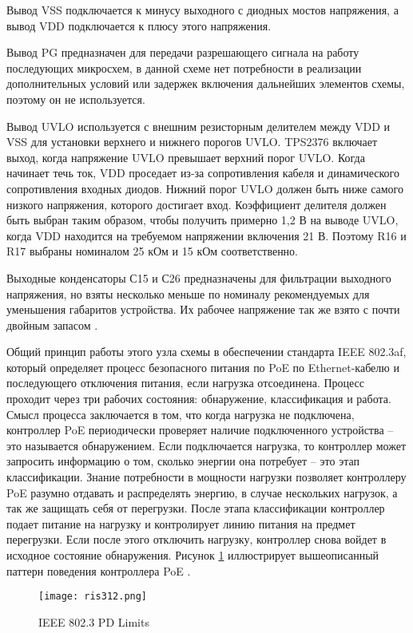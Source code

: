 Вывод VSS подключается к минусу выходного с диодных мостов напряжения, 
а вывод VDD подключается к плюсу этого напряжения.

Вывод PG предназначен для передачи разрешающего сигнала на работу последующих микросхем,
в данной схеме нет потребности в реализации дополнительных условий или задержек включения
дальнейших элементов схемы, поэтому он не используется.

Вывод UVLO используется с внешним резисторным делителем между VDD и VSS для установки 
верхнего и нижнего порогов UVLO. TPS2376 включает выход, когда напряжение UVLO превышает верхний 
порог UVLO. Когда начинает течь ток, VDD проседает из-за сопротивления кабеля и динамического 
сопротивления входных диодов. Нижний порог UVLO должен быть ниже самого низкого напряжения, 
которого достигает вход. Коэффициент делителя должен быть выбран таким образом, 
чтобы получить примерно 1,2 В на выводе UVLO, когда VDD находится на требуемом 
напряжении включения 21 В. Поэтому R16 и R17 выбраны номиналом 25 кОм и 15 кОм соответственно.

Выходные конденсаторы С15 и С26 предназначены для фильтрации выходного напряжения, но взяты 
несколько меньше по номиналу рекомендуемых для уменьшения габаритов устройства. Их рабочее
напряжение так же взято с почти двойным запасом \cite{TPS2376:datasheet}.

Общий принцип работы этого узла схемы в обеспечении стандарта IEEE 802.3af, который определяет 
процесс безопасного питания по PoE по Ethernet-кабелю и последующего отключения питания, 
если нагрузка отсоединена. Процесс проходит через три рабочих состояния: обнаружение, 
классификация и работа. Смысл процесса заключается в том, что когда нагрузка не подключена,
контроллер PoE периодически проверяет наличие подключенного устройства -- это называется 
обнаружением. Если подключается нагрузка, то контроллер может запросить информацию о том,
сколько энергии она потребует -- это этап классификации. Знание потребности в мощности нагрузки 
позволяет контроллеру PoE разумно отдавать и распределять энергию, в случае нескольких нагрузок,
а так же защищать себя от перегрузки. После этапа классификации контроллер подает питание на 
нагрузку и контролирует линию питания на предмет перегрузки. Если после этого отключить нагрузку,
контроллер снова войдет в исходное состояние обнаружения. Рисунок \ref{ris:312}  иллюстрирует 
вышеописанный паттерн поведения контроллера PoE \cite{TPS2376:datasheet}.

\begin{figure}[H]
    \centering
    \texttt{[image: ris312.png]}
    \caption{IEEE 802.3 PD Limits}
    \label{ris:312}
\end{figure}

